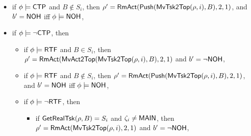 {\begin{itemize}
\begin{itemize}
\begin{itemize}
\begin{itemize}
\begin{itemize}
\begin{itemize}
						\end{itemize}
						\item if $\phi \models{\sf CTP}$ and $B \notin S_i$, then $\rho' = \mathsf{RmAct}(\mathsf{Push}(\mathsf{MvTsk2Top}(\rho, i), B), 2, 1)$, and $b' = {\sf NOH}$ iff $\phi \models {\sf NOH}$, 
						\item if $\phi \models\neg{\sf CTP}$, then
						\begin{itemize}
							\item if $\phi \models {\sf RTF}$ and $B\in S_i$, then $\rho' = \mathsf{RmAct}(\mathsf{MvAct2Top}(\mathsf{MvTsk2Top}(\rho, i), B), 2, 1)$ and $b' = \neg {\sf NOH}$, 
							\item if $\phi \models {\sf RTF}$ and $B\notin S_i$, then $\rho' = \mathsf{RmAct}(\mathsf{Push}(\mathsf{MvTsk2Top}(\rho, i), B), 2, 1)$, and $b' = {\sf NOH}$ iff $\phi \models {\sf NOH}$, 
							\item if $\phi \models \neg {\sf RTF}$, then
							\begin{itemize}
								\item if $\mathsf{GetRealTsk}(\rho,B) = S_i$ and $\zeta_i \neq {\sf MAIN}$, then $\rho' = \mathsf{RmAct}(\mathsf{MvTsk2Top}(\rho, i), 2, 1)$ and $b' = \neg {\sf NOH}$, 

\end{itemize}
\end{itemize}
\end{itemize}
\end{itemize}
\end{itemize}
\end{itemize}
\end{itemize}}
